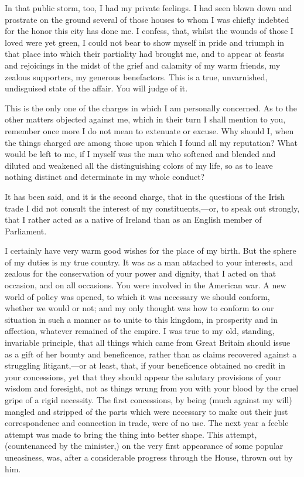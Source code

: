 In that public storm, too, I had my private feelings. I had seen blown down and prostrate on the ground several of those houses to whom I was chiefly indebted for the honor this city has done me. I confess, that, whilst the wounds of those I loved were yet green, I could not bear to show myself in pride and triumph in that place into which their partiality had brought me, and to appear at feasts and rejoicings in the midst of the grief and calamity of my warm friends, my zealous supporters, my generous benefactors. This is a true, unvarnished, undisguised state of the affair. You will judge of it.

This is the only one of the charges in which I am personally concerned. As to the other matters objected against me, which in their turn I shall mention to you, remember once more I do not mean to extenuate or excuse. Why should I, when the things charged are among those upon which I found all my reputation? What would be left to me, if I myself was the man who softened and blended and diluted and weakened all the distinguishing colors of my life, so as to leave nothing distinct and determinate in my whole conduct?

It has been said, and it is the second charge, that in the questions of the Irish trade I did not consult the interest of my constituents,—or, to speak out strongly, that I rather acted as a native of Ireland than as an English member of Parliament.

I certainly have very warm good wishes for the place of my birth. But the sphere of my duties is my true country. It was as a man attached to your interests, and zealous for the conservation of your power and dignity, that I acted on that occasion, and on all occasions. You were involved in the American war. A new world of policy was opened, to which it was necessary we should conform, whether we would or not; and my only thought was how to conform to our situation in such a manner as to unite to this kingdom, in prosperity and in affection, whatever remained of the empire. I was true to my old, standing, invariable principle, that all things which came from Great Britain should issue as a gift of her bounty and beneficence, rather than as claims recovered against a struggling litigant,—or at least, that, if your beneficence obtained no credit in your concessions, yet that they should appear the salutary provisions of your wisdom and foresight, not as things wrung from you with your blood by the cruel gripe of a rigid necessity. The first concessions, by being (much against my will) mangled and stripped of the parts which were necessary to make out their just correspondence and connection in trade, were of no use. The next year a feeble attempt was made to bring the thing into better shape. This attempt, (countenanced by the minister,) on the very first appearance of some popular uneasiness, was, after a considerable progress through the House, thrown out by him.

